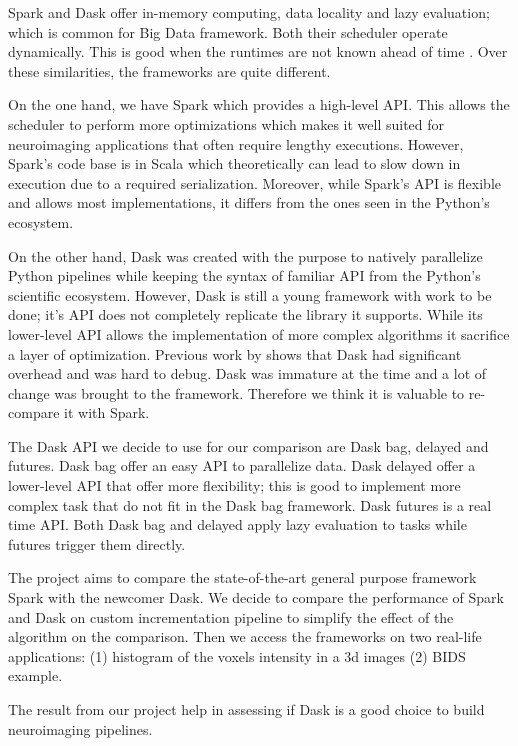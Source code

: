 \documentclass[11pt,a4paper]{article}
\begin{document}
Spark and Dask offer in-memory computing, data locality and lazy evaluation; which is common for Big Data framework. Both their scheduler operate dynamically. This is good when the runtimes are not known ahead of time \citep{Dask:15}. Over these similarities, the frameworks are quite different.

On the one hand, we have Spark which provides a high-level API. This allows the scheduler to perform more optimizations which makes it well suited for neuroimaging applications that often require lengthy executions. However, Spark's code base is in Scala which theoretically can lead to slow down in execution due to a required serialization. Moreover, while Spark's API is flexible and allows most implementations, it differs from the ones seen in the Python's ecosystem.

On the other hand, Dask was created with the purpose to natively parallelize Python pipelines while keeping the syntax of familiar API from the Python's scientific ecosystem. However, Dask is still a young framework with work to be done; it's API does not completely replicate the library it supports. While its lower-level API allows the implementation of more complex algorithms it sacrifice a layer of optimization.
Previous work by \citet{Mehta:17} shows that Dask had significant overhead and was hard to debug. 
Dask was immature at the time and a lot of change was brought to the framework. Therefore we think it is valuable to re-compare it with Spark.

The Dask API we decide to use for our comparison are Dask bag, delayed and futures. Dask bag offer an easy API to parallelize data. Dask delayed offer a lower-level API that offer more flexibility; this is good to implement more complex task that do not fit in the Dask bag framework. Dask futures is a real time API. Both Dask bag and delayed apply lazy evaluation to tasks while futures trigger them directly.

The project aims to compare the state-of-the-art general purpose framework Spark with the newcomer Dask. We decide to compare the performance of Spark and Dask on custom incrementation pipeline to simplify the effect of the algorithm on the comparison. Then we access the frameworks on two real-life applications: (1) histogram of the voxels intensity in a 3d images (2) BIDS example.

The result from our project help in assessing if Dask is a good choice to build neuroimaging pipelines.
\end{document}
